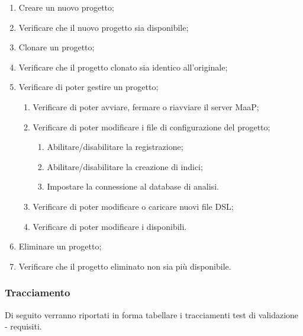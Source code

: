 \begin{enumerate}
\item Creare un nuovo progetto;
\item Verificare che il nuovo progetto sia disponibile;
\item Clonare un progetto;
\item Verificare che il progetto clonato sia identico all’originale;
\item Verificare di poter gestire un progetto;
\begin{enumerate}
\item Verificare di poter avviare, fermare o riavviare il server MaaP;
\item Verificare di poter modificare i file di configurazione del progetto;
\begin{enumerate}
\item Abilitare/disabilitare la registrazione;
\item Abilitare/disabilitare la creazione di indici;
\item Impostare la connessione al database di analisi.
\end{enumerate}
\item Verificare di poter modificare o caricare nuovi file DSL;
\item Verificare di poter modificare i  disponibili.
\end{enumerate}
\item Eliminare un progetto;
\item Verificare che il progetto eliminato non sia più disponibile.
\end{enumerate}

\subsubsection{Tracciamento}
Di seguito verranno riportati in forma tabellare i tracciamenti test di validazione - requisiti.\\
